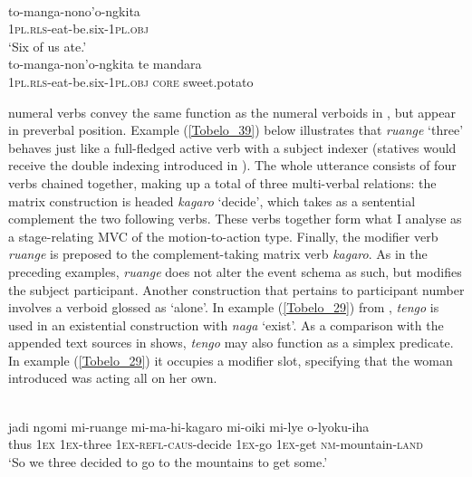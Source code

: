 \ea \label{Tukang_37}
\\
\ea
\gll to-manga-nono'o-ngkita \\
1\textsc{pl}.\textsc{rls}-eat-be.six-1\textsc{pl}.\textsc{obj} \\
\glft `Six of us ate.' \\ 
\ex
\gll *to-manga-non'o-ngkita te mandara \\ 
1\textsc{pl}.\textsc{rls}-eat-be.six-1\textsc{pl}.\textsc{obj} \textsc{core} sweet.potato \\
\z
\z

 numeral verbs convey the same function as the numeral verboids in , but appear in preverbal position. Example (\ref{Tobelo_39}) below illustrates that \textit{ruange} `three' behaves just like a full-fledged active verb with a subject indexer (statives would receive the double indexing introduced in ). The whole utterance consists of four verbs chained together, making up a total of three multi-verbal relations: the matrix construction is headed \textit{kagaro} `decide', which takes as a sentential complement the two following verbs. These verbs together form what I analyse as a stage-relating MVC of the motion-to-action type. Finally, the modifier verb \textit{ruange} is preposed to the complement-taking matrix verb \textit{kagaro}. As in the preceding examples, \textit{ruange} does not alter the event schema as such, but modifies the subject participant. Another construction that pertains to participant number involves a verboid glossed as `alone'. In example (\ref{Tobelo_29}) from , \textit{tengo} is used in an existential construction with \textit{naga} `exist'. As a comparison with the appended text sources in \citet{holton2003tobelo} shows, \textit{tengo} may also function as a simplex predicate. In example (\ref{Tobelo_29}) it occupies a modifier slot, specifying that the woman introduced was acting all on her own. 

\ea \label{Tobelo_39}
\\
\gll jadi  ngomi mi-ruange mi-ma-hi-kagaro mi-oiki mi-lye o-lyoku-iha \\
thus 1\textsc{ex} 1\textsc{ex}-three 1\textsc{ex}-\textsc{refl}-\textsc{caus}-decide 1\textsc{ex}-go 1\textsc{ex}-get \textsc{nm}-mountain-\textsc{land} \\
\glft `So we three decided to go to the mountains to get some.'\\ 
\z

